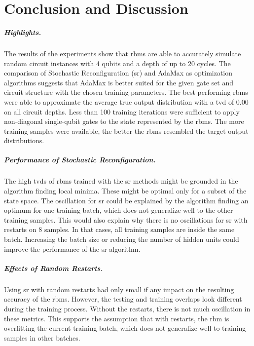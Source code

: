 \chapter{Conclusion and Discussion}
\label{sec:discussion}

\paragraph{Highlights.}
The results of the experiments show that \gls{rbm}s are able to accurately simulate random circuit 
instances with 4 qubits and a depth of up to 20 cycles. The comparison of 
Stochastic Reconfiguration (\gls{sr}) and AdaMax as optimization algorithms suggests that 
AdaMax is better suited for the given gate set and circuit structure with the chosen training 
parameters. The best performing \gls{rbm}s were able to approximate the average true output 
distribution with a \gls{tvd} of 0.00 on all circuit depths. Less than 100 training iterations were sufficient to 
apply non-diagonal single-qubit gates to the state represented by the \gls{rbm}s. 
The more training samples were available, the better the \gls{rbm}s resembled the target output distributions.

\paragraph{Performance of Stochastic Reconfiguration.}
The high \gls{tvd}s of \gls{rbm}s trained with the \gls{sr} methods might be grounded in the algorithm finding 
local minima. These might be optimal only for a subset of the state space. The oscillation for \gls{sr} could be explained by the algorithm finding an 
optimum for one training batch, which does not generalize well to the other training samples.
This would also explain why there is no oscillations for \gls{sr} with restarts on 8 samples. In that
cases, all training samples are inside the same batch. Increasing the batch size or reducing the 
number of hidden units could improve the performance of the \gls{sr} algorithm.

\paragraph{Effects of Random Restarts.}
Using \gls{sr} with random restarts had only small if any 
impact on the resulting accuracy of the \gls{rbm}s. However, the testing and training overlaps 
look different during the training process. Without the restarts, there is not much 
oscillation in these metrics. This supports the assumption that with restarts, the 
\gls{rbm} is overfitting the current training batch, which does not generalize well to training 
samples in other batches. 

